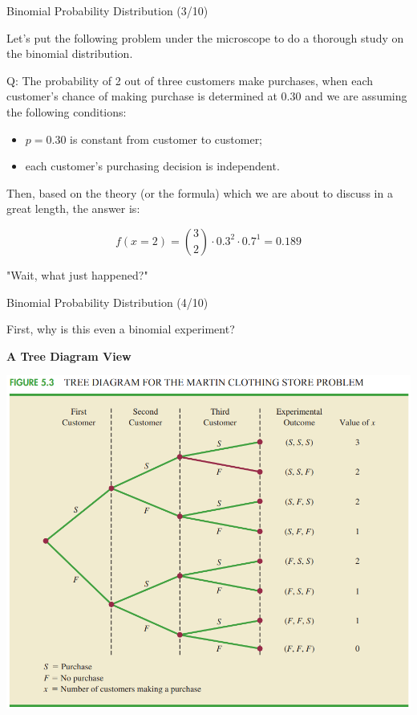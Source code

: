 \documentclass{beamer}
\begin{document}
\begin{frame}{Binomial Probability Distribution (3/10)}

Let's put the following problem under the microscope to do a thorough study on the binomial distribution. 

\vspace{0.3 cm}
Q: The probability of 2 out of three customers make purchases, when each customer's chance of making purchase is determined at 0.30 and we are assuming the following conditions:
\begin{itemize}
\item $p = 0.30$ is constant from customer to customer; 
\item each customer's purchasing decision is independent.
\end{itemize}

\vspace{0.3 cm}
Then, based on the theory (or the formula) which we are about to discuss in a great length, the answer is: 

$$ f(x=2) =  {3 \choose 2} \cdot 0.3^2 \cdot 0.7^1 = 0.189 $$ 

\begin{center}
\begin{large}
"Wait, what just happened?"
\end{large}
\end{center}


\end{frame}




\begin{frame}{Binomial Probability Distribution (4/10)}

First, why is this even a binomial experiment? 

\begin{center}

\textbf{A Tree Diagram View}

\vspace{0.3 cm}

\includegraphics[scale=0.30]{images/ch3TreeDiagram.png}

\end{center}
\end{frame}
\end{document}
